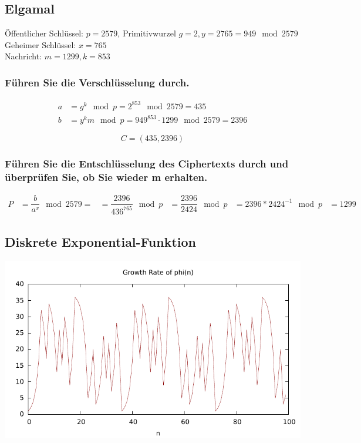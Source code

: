 \subsection{Elgamal}
Öffentlicher Schlüssel: $p = 2579$, Primitivwurzel $g = 2, y = 2765 = 949 \mod 2579$ \\
Geheimer Schlüssel: $x = 765$ \\
Nachricht: $m = 1299, k = 853$\\
\subsubsection{Führen Sie die Verschlüsselung durch.}

\begin{align}
	a&= g^k \mod p = 2^{853} \mod 2579 = 435 \\
	b&= y^km \mod p = 949^{853} \cdot 1299 \mod 2579 =2396
\end{align}

\[ C= (435,2396) \]

\subsubsection{Führen Sie die Entschlüsselung des Ciphertexts durch und überprüfen Sie, ob
Sie wieder m erhalten.}

\begin{align}
	P &= \dfrac{b}{a^x} \mod 2579= 
      &= \dfrac{2396}{436^{765}} \mod p  
	  &= \dfrac{2396}{2424} \mod p 
	  &= 2396 * 2424^{-1} \mod p
      &= 1299
\end{align}



\subsection{Diskrete Exponential-Funktion}

\includegraphics[scale=1]{eclipse/expofun.pdf}


